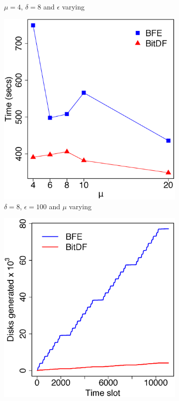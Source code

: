 \begin{figure}
\begin{subfigure}[t]{0.48\textwidth}
        \caption{$\mu = 4$, $\delta = 8$ and $\epsilon$ varying}
        \label{fig:berlinmod_vary_g}
    \end{subfigure}
    \begin{subfigure}[t]{0.48\textwidth}
        \includegraphics[width=\textwidth]{images/BerlinMOD_l_8_g_100_varying_n.eps}
        \caption{$\delta = 8$, $\epsilon = 100$ and $\mu$ varying}
        \label{fig:berlinmod_vary_n}
    \end{subfigure}
    \begin{subfigure}[t]{0.48\textwidth}
        \includegraphics[width=\textwidth]{images/BerlinMOD_d.eps}

\end{subfigure}
\end{figure}
